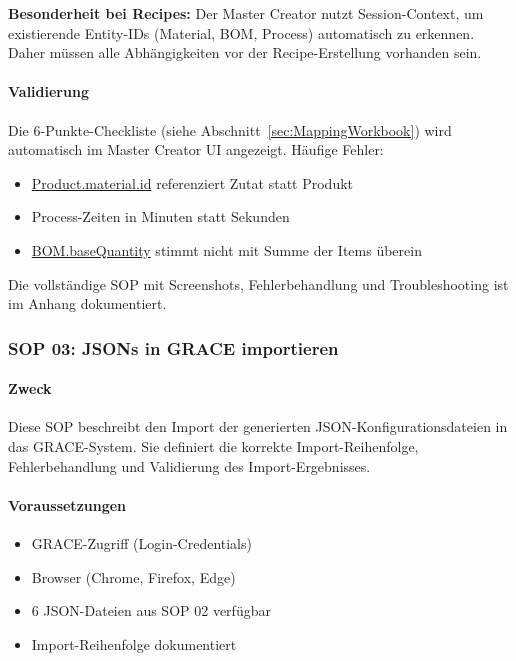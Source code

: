 \textbf{Besonderheit bei Recipes:} Der Master Creator nutzt Session-Context, um existierende Entity-IDs (Material, BOM, Process) automatisch zu erkennen. Daher müssen alle Abhängigkeiten vor der Recipe-Erstellung vorhanden sein.

\paragraph{Validierung}

Die 6-Punkte-Checkliste (siehe Abschnitt~\ref{sec:MappingWorkbook}) wird automatisch im Master Creator UI angezeigt. Häufige Fehler:

\begin{itemize}
    \item \url{Product.material.id} referenziert Zutat statt Produkt
    \item Process-Zeiten in Minuten statt Sekunden
    \item \url{BOM.baseQuantity} stimmt nicht mit Summe der Items überein
\end{itemize}

\noindent Die vollständige SOP mit Screenshots, Fehlerbehandlung und Troubleshooting ist im Anhang dokumentiert.

\subsubsection{SOP 03: JSONs in GRACE importieren}

\paragraph{Zweck}

Diese SOP beschreibt den Import der generierten JSON-Konfigurationsdateien in das GRACE-System. Sie definiert die korrekte Import-Reihenfolge, Fehlerbehandlung und Validierung des Import-Ergebnisses.

\paragraph{Voraussetzungen}

\begin{itemize}
    \item GRACE-Zugriff (Login-Credentials)
    \item Browser (Chrome, Firefox, Edge)
    \item 6 JSON-Dateien aus SOP 02 verfügbar
    \item Import-Reihenfolge dokumentiert
\end{itemize}

